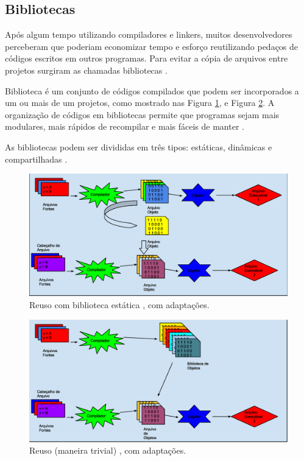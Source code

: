 \subsection{Bibliotecas}

Após algum tempo utilizando compiladores e linkers, muitos 
desenvolvedores perceberam que poderiam economizar tempo e esforço 
reutilizando pedaços de códigos escritos em outros programas. Para evitar a
 cópia de arquivos entre projetos surgiram as chamadas bibliotecas \cite[pág.  227]{ref36}.

Biblioteca é um conjunto de códigos compilados que podem ser incorporados a
 um ou mais de um projetos, como mostrado nas Figura \ref{fig04}, e Figura
 \ref{fig05}. A organização de códigos em bibliotecas permite que 
programas sejam mais modulares, mais rápidos de recompilar e mais 
fáceis de manter \cite{Lasca}.

As bibliotecas podem ser divididas em três tipos: estáticas, 
dinâmicas e compartilhadas \cite{Lasca}.

\begin{figure}[h]
    \centering
        \includegraphics[keepaspectratio=true,scale=0.38]{figuras/reuso_lib_estatica.eps}
    \caption{Reuso com biblioteca estática \cite[pág.  54]{ref39}, com adaptações.}
    \label{fig04}
\end{figure}

\begin{figure}[h]
    \centering
        \includegraphics[keepaspectratio=true,scale=0.38]{figuras/reuso_lib_estatica2.eps}
    \caption{Reuso (maneira trivial) \cite[pág.  54]{ref39}, com adaptações.}
    \label{fig05}
\end{figure}


